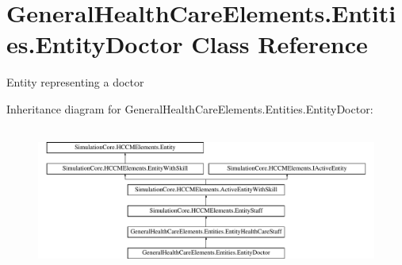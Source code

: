 \hypertarget{class_general_health_care_elements_1_1_entities_1_1_entity_doctor}{}\section{General\+Health\+Care\+Elements.\+Entities.\+Entity\+Doctor Class Reference}
\label{class_general_health_care_elements_1_1_entities_1_1_entity_doctor}


Entity representing a doctor  


Inheritance diagram for General\+Health\+Care\+Elements.\+Entities.\+Entity\+Doctor\+:\begin{figure}[H]
\begin{center}
\leavevmode
\includegraphics[height=4.827586cm]{class_general_health_care_elements_1_1_entities_1_1_entity_doctor}
\end{center}
\end{figure}
